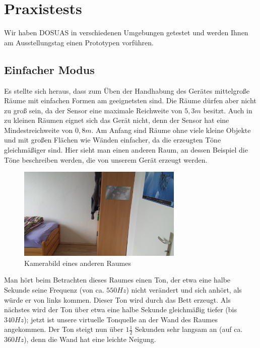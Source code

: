 \documentclass[a4paper,12pt,ngerman]{scrartcl}
\begin{document}
\newpage

\section{Praxistests} \label{testsAndResults}

Wir haben DOSUAS in verschiedenen Umgebungen getestet und werden Ihnen am Ausstellungstag einen Prototypen vorführen.

\subsection{Einfacher Modus}

Es stellte sich heraus, dass zum Üben der Handhabung des Gerätes mittelgroße Räume mit einfachen
Formen am geeignetsten sind. Die Räume dürfen aber nicht zu groß sein, da der Sensor eine maximale Reichweite
von $5,3 m$ besitzt. Auch in zu kleinen Räumen eignet sich das Gerät nicht, denn der Sensor hat eine Mindestreichweite von $0,8 m$.
Am Anfang sind Räume ohne viele kleine Objekte und mit großen Flächen wie Wänden einfacher, da die erzeugten Töne gleichmäßiger sind.
Hier sieht man einen anderen Raum, an dessen Beispiel die Töne beschreiben werden, die von unserem Gerät erzeugt werden.
\begin{figure}[H]
	\centering
	\includegraphics[angle=180,width=0.7\textwidth]{20180120_114953}
	\caption{Kamerabild eines anderen Raumes}
	\label{normal_picture}
\end{figure} \par
Man hört beim Betrachten dieses Raumes einen Ton, der etwa eine halbe Sekunde seine Frequenz (von ca. $550 Hz$) nicht verändert und sich anhört, als würde er von links kommen. Dieser Ton wird durch das Bett
erzeugt. Als nächstes wird der Ton über etwa eine halbe Sekunde gleichmäßig tiefer (bis $340 Hz$); 
jetzt ist unsere virtuelle Tonquelle an der Wand des Raumes angekommen. Der Ton steigt nun über $1\frac{1}{2}$ Sekunden sehr langsam an (auf ca. $360 Hz$), denn die Wand hat eine leichte Neigung. 
\end{document}
